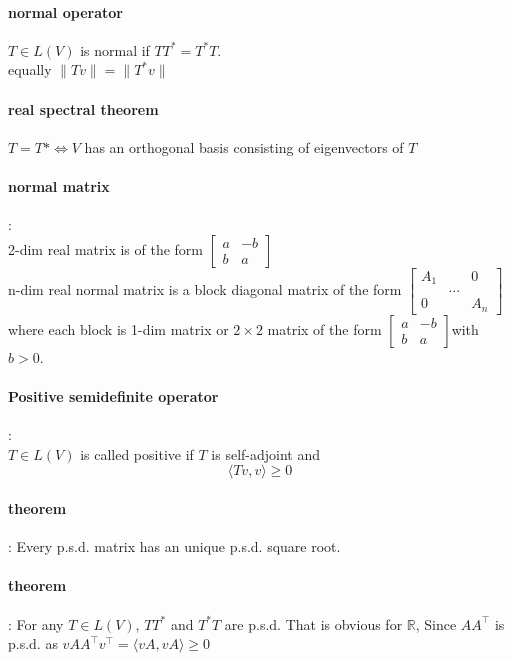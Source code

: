 \documentclass[letterpaper]{article}
\begin{document}
\paragraph{normal operator}
$T \in L(V)$ is normal if $TT^*=T^*T$.\\
equally $\|Tv\|=\|T^*v\|$
\paragraph{real spectral theorem}
$T=T* \iff V$ has an orthogonal basis consisting of eigenvectors of $T$   

\paragraph{normal matrix}:\\
2-dim real matrix is of the form
$\begin{bmatrix}
 a & -b \\
 b & a 
 \end{bmatrix}$\\
n-dim real normal matrix is a block diagonal matrix of the form
$\begin{bmatrix}
A_1 && 0 \\
&...&\\
0 &&  A_n
\end{bmatrix}$where each block is 1-dim matrix or $2\times2$ matrix of the form
$\begin{bmatrix}
a & -b \\
b & a 
\end{bmatrix}$\quad with $b>0$.

\paragraph{Positive semidefinite operator}:\\
$T \in L(V)$ is called positive if $T$ is self-adjoint and 
\begin{displaymath}
\langle Tv,v \rangle \geq 0
\end{displaymath}

\paragraph{theorem}: Every p.s.d. matrix has an unique p.s.d. square root.

\paragraph{theorem}: For any $T \in L(V)$, $TT^*$ and $T^*T$ are p.s.d. That is obvious for $\mathbb{R}$, Since $AA^\top$ is p.s.d. as $vAA^\top v^\top = \langle vA,vA \rangle \geq 0$ 
\end{document}
